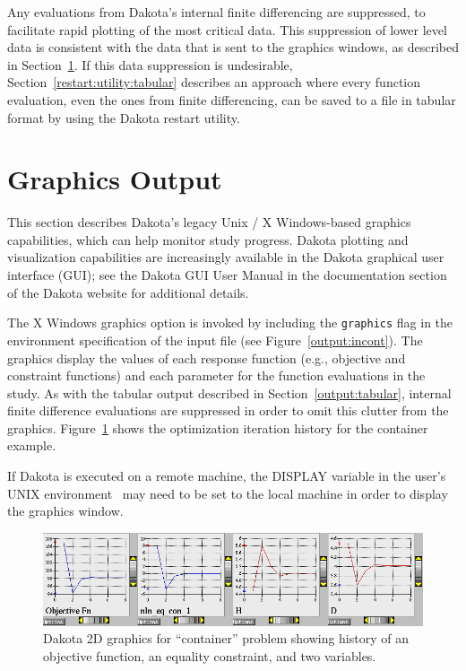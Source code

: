 Any evaluations from Dakota's internal finite differencing are
suppressed, to facilitate rapid plotting of the most critical data.
This suppression of lower level data is consistent with the data that
is sent to the graphics windows, as described in
Section~\ref{output:graphics}. If this data suppression is
undesirable, Section~\ref{restart:utility:tabular} describes an
approach where every function evaluation, even the ones from finite
differencing, can be saved to a file in tabular format by using the
Dakota restart utility.


\section{Graphics Output}\label{output:graphics}

This section describes Dakota's legacy Unix / X Windows-based graphics
capabilities, which can help monitor study progress. Dakota plotting
and visualization capabilities are increasingly available in the
Dakota graphical user interface (GUI); see the Dakota GUI User Manual
in the documentation section of the Dakota website for additional
details.

The X Windows graphics option is invoked by including the
\texttt{graphics} flag in the environment specification of the input
file (see Figure~\ref{output:incont}). The graphics display the values
of each response function (e.g., objective and constraint functions)
and each parameter for the function evaluations in the study. As with
the tabular output described in Section~\ref{output:tabular}, internal
finite difference evaluations are suppressed in order to omit this
clutter from the graphics.  Figure~\ref{output:2dcont} shows the
optimization iteration history for the container example.

If Dakota is executed on a remote machine, the DISPLAY variable in the
user's UNIX environment~\cite{Gil92} may need to be set to the local
machine in order to display the graphics window. 

\begin{figure}
\centering
\includegraphics[width=\textwidth]{images/container_graphic}
\caption{Dakota 2D graphics for ``container'' problem showing history of
an objective function, an equality constraint, and two variables.}
\label{output:2dcont}
\end{figure}

